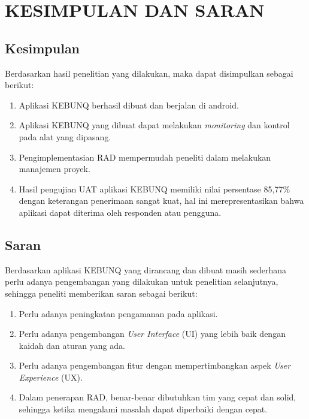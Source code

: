 \chapter{KESIMPULAN DAN SARAN}

%
\vspace{4.5pt}

\begin{onehalfspace}
    \begin{flushleft}
        \begin{justify}
            \section{Kesimpulan}
            Berdasarkan hasil penelitian yang dilakukan, maka dapat disimpulkan sebagai berikut:
            \begin{enumerate}
                \item Aplikasi KEBUNQ berhasil dibuat dan berjalan di android.
                \item Aplikasi KEBUNQ yang dibuat dapat melakukan \emph{monitoring} dan kontrol pada alat yang dipasang.
                \item Pengimplementasian RAD mempermudah peneliti dalam melakukan manajemen proyek.
                \item Hasil pengujian UAT aplikasi KEBUNQ memiliki nilai persentase 85,77\% dengan keterangan penerimaan sangat kuat, hal ini merepresentasikan bahwa aplikasi dapat diterima oleh responden atau pengguna.\\
            \end{enumerate}
    
            
            \section{Saran}
            Berdasarkan aplikasi KEBUNQ yang dirancang dan dibuat masih sederhana perlu adanya pengembangan yang dilakukan untuk penelitian selanjutnya, sehingga peneliti memberikan saran sebagai berikut:
            \begin{enumerate}
                \item Perlu adanya peningkatan pengamanan pada aplikasi.
                \item Perlu adanya pengembangan \emph{User Interface} (UI) yang lebih baik dengan kaidah dan aturan yang ada.
                \item Perlu adanya pengembangan fitur dengan mempertimbangkan aspek \emph{User Experience} (UX).
                \item Dalam penerapan RAD, benar-benar dibutuhkan tim yang cepat dan solid, sehingga ketika mengalami masalah dapat diperbaiki dengan cepat.
            \end{enumerate}
    
                
        \end{justify}
            
    \end{flushleft}
\end{onehalfspace}


\newpage